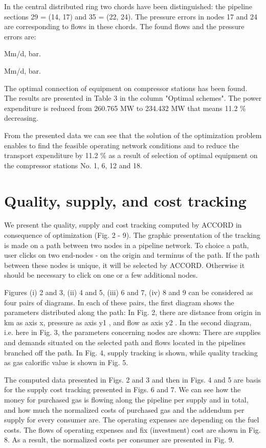 \documentclass{article}
\begin{document}
In the central distributed ring two chords have been distinguished: the
pipeline sections 29 = (14, 17) and 35 = (22, 24). The pressure errors in
nodes 17 and 24 are corresponding to flows in these chords. The found flows
and the pressure errors are:

\qquad  Mm/d, \qquad \qquad  bar.

\qquad  Mm/d, bar.

The optimal connection of equipment on compressor stations has been found.
The results are presented in Table 3 in the column "Optimal schemes". The
power expenditure is reduced from 260.765 MW to 234.432 MW that means 11.2
\% decreasing.

From the presented data we can see that the solution of the optimization
problem enables to find the feasible operating network conditions and to
reduce the transport expenditure by 11.2 \% as a result of selection of
optimal equipment on the compressor stations No. 1, 6, 12 and 18.

\section{Quality, supply, and cost tracking}

We present the quality, supply and cost tracking computed by ACCORD in
consequence of optimization (Fig. 2 - 9). The graphic presentation of the
tracking is made on a path between two nodes in a pipeline network. To
choice a path, user clicks on two end-nodes - on the origin and terminus of
the path. If the path between these nodes is unique, it will be selected by
ACCORD. Otherwise it should be necessary to click on one or a few additional
nodes.

Figures (i) 2 and 3, (ii) 4 and 5, (iii) 6 and 7, (iv) 8 and 9 can be
considered as four pairs of diagrams. In each of these pairs, the first
diagram shows the parameters distributed along the path: In Fig. 2, there
are distance from origin in km as axis x, pressure as axis y1 , and flow as
axis y2 . In the second diagram, i.e. here in Fig. 3, the parameters
concerning nodes are shown: There are supplies and demands situated on the
selected path and flows located in the pipelines branched off the path. In
Fig. 4, supply tracking is shown, while quality tracking as gas calorific
value is shown in Fig. 5.

The computed data presented in Figs. 2 and 3 and then in Figs. 4 and 5 are
basis for the supply cost tracking presented in Figs. 6 and 7. We can see
how the money for purchased gas is flowing along the pipeline per supply and
in total, and how much the normalized costs of purchased gas and the
addendum per supply for every consumer are. The operating expenses are
depending on the fuel costs. The flows of operating expenses and fix
(investment) cost are shown in Fig. 8. As a result, the normalized costs per
consumer are presented in Fig. 9.
\end{document}
